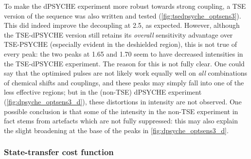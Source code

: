 To make the dPSYCHE experiment more robust towards strong coupling, a TSE version of the sequence was also written and tested (\cref{fig:tsedpsyche_optsens3}).
This did indeed improve the decoupling at \qty{2.5}{\ppm}, as expected.
However, although the TSE-dPSYCHE version still retains its \textit{overall} sensitivity advantage over TSE-PSYCHE (especially evident in the deshielded region), this is not true of every peak: the two peaks at 1.65 and \qty{1.70}{\ppm} seem to have decreased intensities in the TSE-dPSYCHE experiment.
The reason for this is not fully clear.
One could say that the optimised pulses are not likely work equally well on \textit{all} combinations of chemical shifts and couplings, and these peaks may simply fall into one of the less effective regions; but in the (non-TSE) dPSYCHE experiment (\cref{fig:dpsyche_optsens3_d}), these distortions in intensity are not observed.
One possible conclusion is that some of the intensity in the non-TSE experiment in fact stems from artefacts which are not fully suppressed: this may also explain the slight broadening at the base of the peaks in \cref{fig:dpsyche_optsens3_d}.


\iffalse
I then ran several preliminary screens to decide on the number of pulses to include in the pulse sequence.
Here, the 8-chunk cost function was used.
To save time, the total number of function evaluations was capped at 600 times the number of pulses: this, together with the fact that only one optimisation per category was run, means that these results are more suggestive rather than conclusive.
(Since the BFGS algorithm is a local optimiser, and the trajectory depends quite strongly on the initial point, the optimisation should \textit{in theory} be run with several different initial points.)
There was no clear winner, but the optimisations with 9 and 15 pulses yielded the best results; since optimising 18 parameters is easier than 30, I opted to go with 9 pulses.

\begin{figure}[htb]
    \centering
    \texttt{[image: pureshift/opt\_npulses.png]}%
    \caption[Comparison of cost functions attained with different numbers of pulses]{Blah}
    \label{fig:dpsyche_opt_npulses}
\end{figure}
\fi


\subsubsection{State-transfer cost function}

